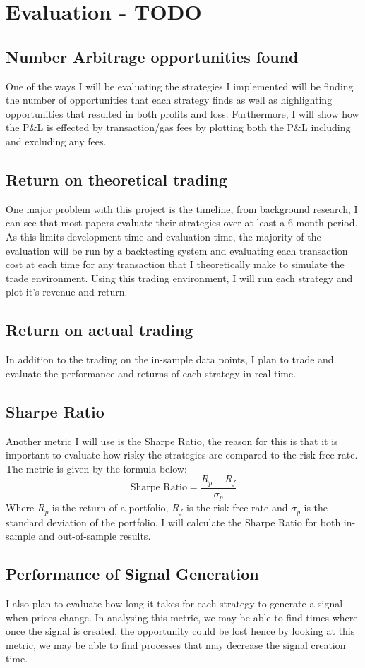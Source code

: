 \chapter{Evaluation - TODO}

\section{Number Arbitrage opportunities found}
One of the ways I will be evaluating the strategies I implemented will be finding the number of opportunities that each strategy finds as well as highlighting opportunities that resulted in both profits and loss. Furthermore, I will show how the P\&L is effected by transaction/gas fees by plotting both the P\&L including and excluding any fees.

\section{Return on theoretical trading}
One major problem with this project is the timeline, from background research, I can see that most papers evaluate their strategies over at least a 6 month period. As this limits development time and evaluation time, the majority of the evaluation will be run by a backtesting system and evaluating each transaction cost at each time for any transaction that I theoretically make to simulate the trade environment. Using this trading environment, I will run each strategy and plot it's revenue and return.

\section{Return on actual trading}

In addition to the trading on the in-sample data points, I plan to trade and evaluate the performance and returns of each strategy in real time.

\section{Sharpe Ratio}

Another metric I will use is the Sharpe Ratio, the reason for this is that it is important to evaluate how risky the strategies are compared to the risk free rate. The metric is given by the formula below:$$\text{Sharpe Ratio} = \frac{R_p - R_f}{\sigma_p}$$ Where $R_p$ is the return of a portfolio, $R_f$ is the risk-free rate and $\sigma_p$ is the standard deviation of the portfolio. I will calculate the Sharpe Ratio for both in-sample and out-of-sample results. 

\section{Performance of Signal Generation}

I also plan to evaluate how long it takes for each strategy to generate a signal when prices change. In analysing this metric, we may be able to find times where once the signal is created, the opportunity could be lost hence by looking at this metric, we may be able to find processes that may decrease the signal creation time.

